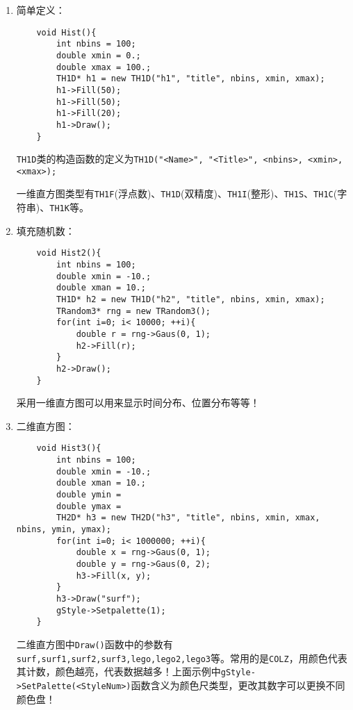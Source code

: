 \documentclass{article}
\begin{document}
\begin{enumerate}
    \item 简单定义：
          \begin{lstlisting}
    void Hist(){
        int nbins = 100;
        double xmin = 0.;
        double xmax = 100.;
        TH1D* h1 = new TH1D("h1", "title", nbins, xmin, xmax);
        h1->Fill(50);
        h1->Fill(50);
        h1->Fill(20);
        h1->Draw();
    }
\end{lstlisting}
          \texttt{TH1D}类的构造函数的定义为\texttt{TH1D("<Name>", "<Title>", <nbins>, <xmin>, <xmax>);}

          一维直方图类型有\texttt{TH1F}(浮点数)、\texttt{TH1D}(双精度)、\texttt{TH1I}(整形)、\texttt{TH1S}、\texttt{TH1C}(字符串)、\texttt{TH1K}等。
    \item 填充随机数：
          \begin{lstlisting}
    void Hist2(){
        int nbins = 100;
        double xmin = -10.;
        double xman = 10.;
        TH1D* h2 = new TH1D("h2", "title", nbins, xmin, xmax);
        TRandom3* rng = new TRandom3();
        for(int i=0; i< 10000; ++i){
            double r = rng->Gaus(0, 1);
            h2->Fill(r);
        }
        h2->Draw();
    }
\end{lstlisting}
          采用一维直方图可以用来显示时间分布、位置分布等等！
    \item 二维直方图：
          \begin{lstlisting}
    void Hist3(){
        int nbins = 100;
        double xmin = -10.;
        double xman = 10.;
        double ymin = 
        double ymax = 
        TH2D* h3 = new TH2D("h3", "title", nbins, xmin, xmax, nbins, ymin, ymax);
        for(int i=0; i< 1000000; ++i){
            double x = rng->Gaus(0, 1);
            double y = rng->Gaus(0, 2);
            h3->Fill(x, y);
        }
        h3->Draw("surf");
        gStyle->Setpalette(1);
    }
\end{lstlisting}
          二维直方图中\texttt{Draw()}函数中的参数有\texttt{surf,surf1,surf2,surf3,lego,lego2,lego3}等。常用的是\texttt{COLZ}，用颜色代表其计数，颜色越亮，代表数据越多！上面示例中\texttt{gStyle->SetPalette(<StyleNum>)}函数含义为颜色尺类型，更改其数字可以更换不同颜色盘！
\end{enumerate}
\end{document}
